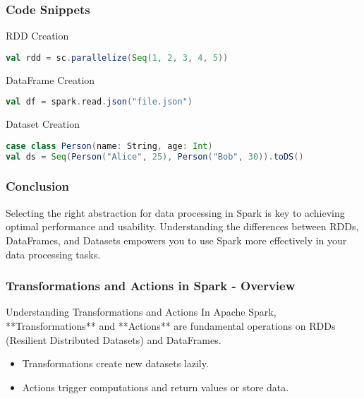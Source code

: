 \documentclass[aspectratio=169]{beamer}
\begin{document}
\begin{frame}[fragile]
    \frametitle{Code Snippets}
    \begin{block}{RDD Creation}
        \begin{lstlisting}[language=Scala]
val rdd = sc.parallelize(Seq(1, 2, 3, 4, 5))
        \end{lstlisting}
    \end{block}
    
    \begin{block}{DataFrame Creation}
        \begin{lstlisting}[language=Scala]
val df = spark.read.json("file.json")
        \end{lstlisting}
    \end{block}

    \begin{block}{Dataset Creation}
        \begin{lstlisting}[language=Scala]
case class Person(name: String, age: Int)
val ds = Seq(Person("Alice", 25), Person("Bob", 30)).toDS()
        \end{lstlisting}
    \end{block}
\end{frame}

\begin{frame}
    \frametitle{Conclusion}
    Selecting the right abstraction for data processing in Spark is key to achieving optimal performance and usability. Understanding the differences between RDDs, DataFrames, and Datasets empowers you to use Spark more effectively in your data processing tasks.
\end{frame}

\begin{frame}[fragile]
    \frametitle{Transformations and Actions in Spark - Overview}
    \begin{block}{Understanding Transformations and Actions}
        In Apache Spark, **Transformations** and **Actions** are fundamental operations on RDDs (Resilient Distributed Datasets) and DataFrames.
        \begin{itemize}
            \item Transformations create new datasets lazily.
            \item Actions trigger computations and return values or store data.
        \end{itemize}
    \end{block}
\end{frame}
\end{document}
